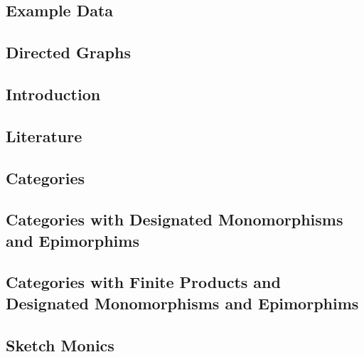 \subsection{Example Data}


\subsection{Directed Graphs}


\subsection{Introduction}


\subsection{Literature}


\subsection{Categories}


\subsection{Categories with Designated Monomorphisms and Epimorphims}



\subsection{Categories with Finite Products and Designated Monomorphisms and Epimorphims}


\subsection{Sketch Monics}


\iffalse
\subsection{Entity-Relationship Notation}

\fi

\iffalse
\begin{frame}{Bibliography}

\end{frame}
\fi

